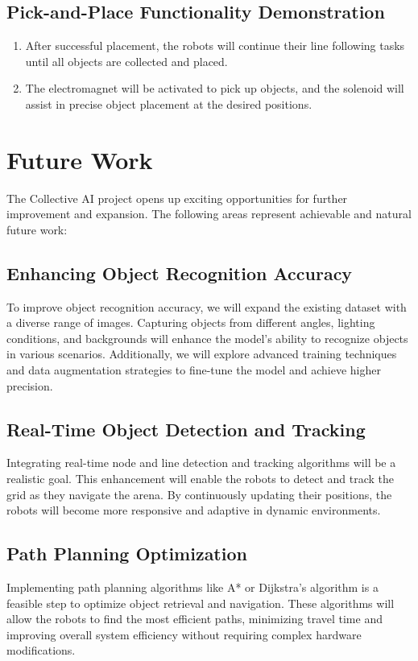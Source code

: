 \documentclass[a4paper,12pt,oneside]{book}
\begin{document}
\subsection{Pick-and-Place Functionality Demonstration}
\begin{enumerate}
  \item After successful placement, the robots will continue their line following tasks until all objects are collected and placed.
  \item The electromagnet will be activated to pick up objects, and the solenoid will assist in precise object placement at the desired positions.
\end{enumerate}
\newpage
\section{Future Work}
The Collective AI project opens up exciting opportunities for further improvement and expansion. The following areas represent achievable and natural future work:

\subsection{Enhancing Object Recognition Accuracy}
To improve object recognition accuracy, we will expand the existing dataset with a diverse range of images. Capturing objects from different angles, lighting conditions, and backgrounds will enhance the model's ability to recognize objects in various scenarios. Additionally, we will explore advanced training techniques and data augmentation strategies to fine-tune the model and achieve higher precision.

\subsection{Real-Time Object Detection and Tracking}
Integrating real-time node and line detection and tracking algorithms will be a realistic goal. This enhancement will enable the robots to detect and track the grid as they navigate the arena. By continuously updating their positions, the robots will become more responsive and adaptive in dynamic environments.

\subsection{Path Planning Optimization}
Implementing path planning algorithms like A* or Dijkstra's algorithm is a feasible step to optimize object retrieval and navigation. These algorithms will allow the robots to find the most efficient paths, minimizing travel time and improving overall system efficiency without requiring complex hardware modifications.
\end{document}
